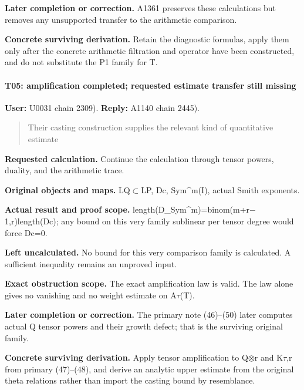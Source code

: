 \textbf{Later completion or correction.} A1361 preserves these
calculations but removes any unsupported transfer to the arithmetic
comparison.

\textbf{Concrete surviving derivation.} Retain the diagnostic formulas,
apply them only after the concrete arithmetic filtration and operator
have been constructed, and do not substitute the P1 family for T.

\paragraph{T05: amplification completed; requested estimate transfer
still
missing}\label{t05-amplification-completed-requested-estimate-transfer-still-missing}

\textbf{User:} U0031
\protect{} chain 2309).
\textbf{Reply:} A1140
\protect{} chain 2445).

\begin{quote}
Their casting construction supplies the relevant kind of quantitative
estimate
\end{quote}

\textbf{Requested calculation.} Continue the calculation through tensor
powers, duality, and the arithmetic trace.

\textbf{Original objects and maps.}
LQ\allowbreak{}\ensuremath{⊂}\allowbreak{}LP, Dc, Sym\^{}m(I), actual
Smith exponents.

\textbf{Actual result and proof scope.}
length(D\_Sym\textasciicircum{}m)=binom(m+r\allowbreak{}\ensuremath{−}\allowbreak{}1,r)length(Dc);
any bound on this very family sublinear per tensor degree would force
Dc=0.

\textbf{Left uncalculated.} No bound for this very comparison family is
calculated. A sufficient inequality remains an unproved input.

\textbf{Exact obstruction scope.} The exact amplification law is valid.
The law alone gives no vanishing and no weight estimate on
A\allowbreak{}\ensuremath{τ}\allowbreak{}(T).

\textbf{Later completion or correction.} The primary note (46)--(50)
later computes actual Q tensor powers and their growth defect; that is
the surviving original family.

\textbf{Concrete surviving derivation.} Apply tensor amplification to
Q\allowbreak{}\ensuremath{⊗}\allowbreak{}r and
K\allowbreak{}\ensuremath{τ}\allowbreak{},r from primary (47)--(48), and
derive an analytic upper estimate from the original theta relations
rather than import the casting bound by resemblance.

